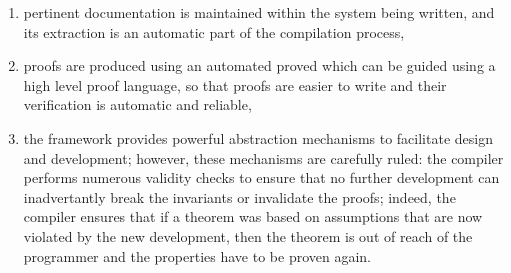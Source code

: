 \begin{enumerate}
\item pertinent documentation is maintained within the system being written,
      and its extraction is an automatic part of the compilation process,
\item proofs are produced using an automated proved which can be guided using a high level proof language, so that proofs
      are easier to write and their verification is automatic and reliable,
\item the framework provides powerful abstraction mechanisms to facilitate
      design and development; however, these mechanisms are carefully ruled:
      the compiler performs numerous validity checks to ensure that no
      further development can inadvertantly break the invariants or
      invalidate the proofs; indeed, the compiler ensures that if a theorem
      was based on assumptions that are now violated by the new development,
      then the theorem is out of reach of the programmer and the properties have to be proven again.
\end{enumerate}




